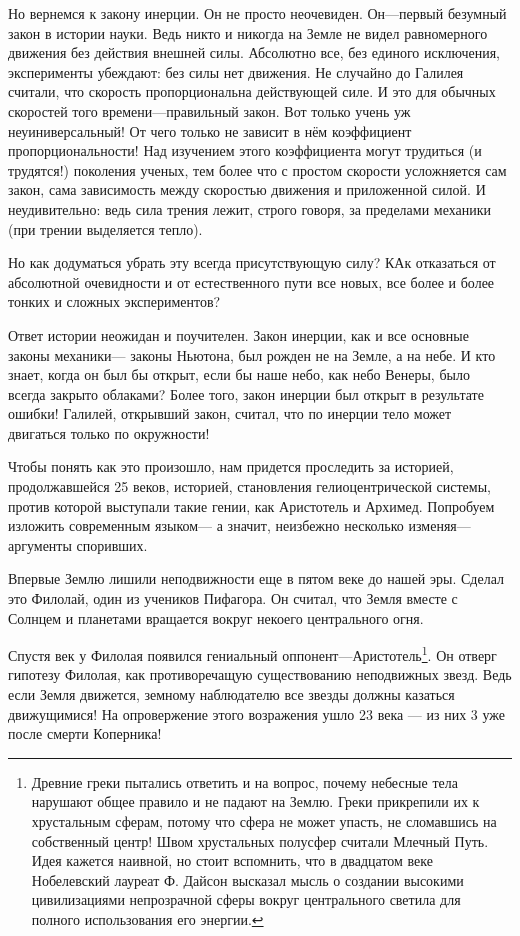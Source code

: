 \documentclass[twocolumn,10pt]{article}
\begin{document}
Но вернемся к закону инерции. Он не просто неочевиден. Он---первый безумный закон в истории науки. Ведь никто и никогда на Земле не видел равномерного движения без действия внешней силы. Абсолютно все, без единого исключения, эксперименты убеждают: без силы нет движения. Не случайно до Галилея считали, что скорость пропорциональна действующей силе. И это для обычных скоростей того времени---правильный закон. Вот только учень уж неуиниверсальный! От чего только не зависит в нём коэффициент пропорциональности! Над изучением этого коэффициента могут трудиться (и трудятся!) поколения ученых, тем более что с простом скорости усложняется сам закон, сама зависимость между скоростью движения и приложенной силой. И неудивительно: ведь сила трения лежит, строго говоря, за пределами механики (при трении выделяется тепло).

Но как додуматься убрать эту всегда присутствующую силу? КАк отказаться от абсолютной очевидности и от естественного пути все новых, все более и более тонких и сложных экспериментов?

Ответ истории неожидан и поучителен. Закон инерции, как и все основные законы механики--- законы Ньютона, был рожден не на Земле, а на небе. И кто знает, когда он был бы открыт, если бы наше небо, как небо Венеры, было всегда закрыто облаками? Более того, закон инерции был открыт в результате ошибки! Галилей, открывший закон, считал, что по инерции тело может двигаться только по окружности!

Чтобы понять как это произошло, нам придется проследить за историей, продолжавшейся 25 веков, историей, становления гелиоцентрической системы, против которой выступали такие гении, как Аристотель и Архимед. Попробуем изложить современным языком--- а значит, неизбежно несколько изменяя---аргументы споривших.

Впервые Землю лишили неподвижности еще в пятом веке до нашей эры. Сделал это Филолай, один из учеников Пифагора. Он считал, что Земля вместе с Солнцем и планетами вращается вокруг некоего центрального огня.

Спустя век у Филолая появился гениальный оппонент---Аристотель\footnote{Древние греки пытались ответить и на вопрос, почему небесные тела нарушают общее правило и не падают на Землю. Греки прикрепили их к хрустальным сферам, потому что сфера не может упасть, не сломавшись на собственный центр! Швом хрустальных полусфер считали Млечный Путь. Идея кажется наивной, но стоит вспомнить, что в двадцатом веке Нобелевский лауреат Ф. Дайсон высказал мысль о создании высокими цивилизациями непрозрачной сферы вокруг центрального светила для полного использования его энергии.}. Он отверг гипотезу Филолая, как противоречащую существованию неподвижных звезд. Ведь если Земля движется, земному наблюдателю все звезды должны казаться движущимися! На опровержение этого возражения ушло 23 века --- из них 3 уже после смерти Коперника!
\end{document}
